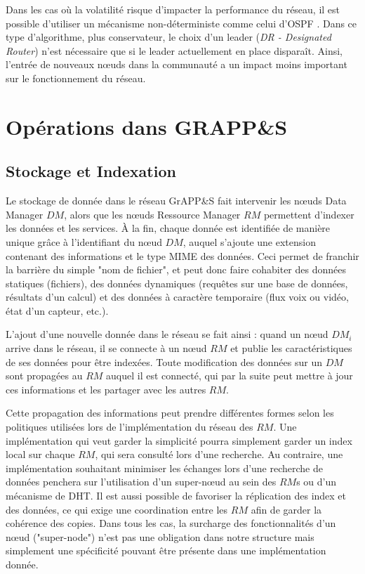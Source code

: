 Dans les cas où la volatilité risque d'impacter la performance du réseau, il est possible d'utiliser un mécanisme non-déterministe comme celui d'OSPF \cite{ISISxOSPF}. Dans ce type d'algorithme, plus conservateur, le choix d'un leader (\textit{DR - Designated Router}) n'est nécessaire que si le leader actuellement en place disparaît. Ainsi, l'entrée de nouveaux n{\oe}uds dans la communauté a un impact moins important sur le fonctionnement du réseau.

 \section{Opérations dans GRAPP\&S\label{SEC:OPERATIONS}}

\subsection{Stockage et Indexation}

Le stockage de donnée dans le réseau GrAPP\&S fait intervenir les n{\oe}uds Data Manager $DM$, alors que les n{\oe}uds Ressource Manager $RM$ permettent d'indexer les données et les services. À la fin, chaque donnée est identifiée de manière unique grâce à l'identifiant du n{\oe}ud $DM$, auquel s'ajoute une extension contenant des informations et le type MIME des données. Ceci permet de franchir la barrière du simple "nom de fichier", et peut donc faire cohabiter des données statiques (fichiers), des données dynamiques (requêtes sur une base de données, résultats d'un calcul) et des données à caractère temporaire (flux voix ou vidéo, état d'un capteur, etc.). 

L'ajout d'une nouvelle donnée dans le réseau se fait ainsi : quand un n{\oe}ud $DM_i$ arrive dans le réseau, il se connecte à un n{\oe}ud $RM$ et publie les caractéristiques de ses données pour être indexées. Toute modification des données sur un $DM$ sont propagées au $RM$ auquel il est connecté, qui par la suite peut mettre à jour ces informations et les partager avec les autres $RM$. 

Cette propagation des informations peut prendre différentes formes selon les politiques utilisées lors de l'implémentation du réseau des $RM$. Une implémentation qui veut garder la simplicité pourra simplement garder un index local sur chaque $RM$, qui sera consulté lors d'une recherche. Au contraire, une implémentation souhaitant minimiser les échanges lors d'une recherche de données penchera sur l'utilisation d'un super-n{\oe}ud au sein des $RM$s ou d'un mécanisme de DHT. Il est aussi possible de favoriser la réplication des index et des données, ce qui exige une coordination entre les $RM$ afin de garder la cohérence des copies. Dans tous les cas, la surcharge des fonctionnalités d'un n{\oe}ud ("super-node") n'est pas une obligation dans notre structure mais simplement une spécificité pouvant être présente dans une implémentation donnée. 

